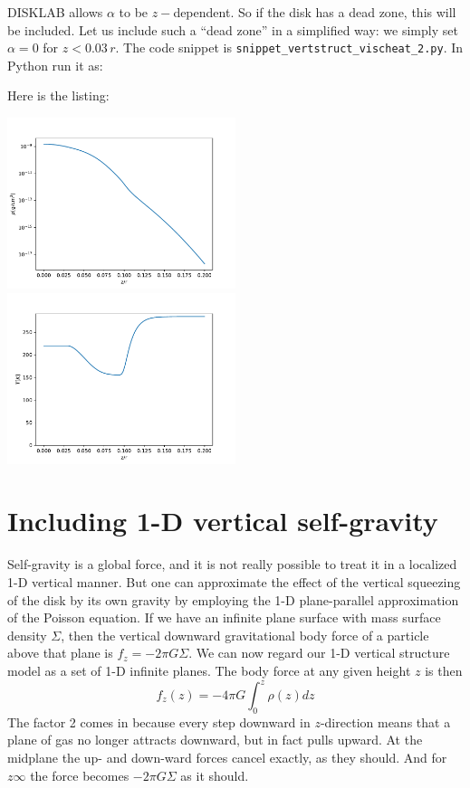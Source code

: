 \documentclass{book}
\newcommand{\code}[1]{{\small\tt #1}}
\begin{document}
{\sf DISKLAB} allows $\alpha$ to be $z-$dependent. So if the disk has a dead
zone, this will be included. Let us include such a ``dead zone'' in a simplified way:
we simply set $\alpha=0$ for $z<0.03\,r$. The code snippet is
\code{snippet\_vertstruct\_vischeat\_2.py}. In Python run it as:
\begin{codebox}
\end{codebox}
Here is the listing:

\centerline{\includegraphics[width=0.5\textwidth]{../snippets/fig_snippet_vertstruct_vischeat_2_1.pdf}
  \includegraphics[width=0.5\textwidth]{../snippets/fig_snippet_vertstruct_vischeat_2_2.pdf}}

\section{Including 1-D vertical self-gravity}
\label{sec-selfgrav1d-vertical}
Self-gravity is a global force, and it is not really possible to treat it in a
localized 1-D vertical manner. But one can approximate the effect of the
vertical squeezing of the disk by its own gravity by employing the 1-D
plane-parallel approximation of the Poisson equation. If we have an infinite
plane surface with mass surface density $\Sigma$, then the vertical downward
gravitational body force of a particle above that plane is $f_z=-2\pi G\Sigma$.
We can now regard our 1-D vertical structure model as a set of 1-D infinite
planes. The body force at any given height $z$ is then
\begin{equation}
f_z(z) = - 4\pi G \int_0^z \rho(z)dz
\end{equation}
The factor 2 comes in because every step downward in $z$-direction means that a
plane of gas no longer attracts downward, but in fact pulls upward. At the midplane
the up- and down-ward forces cancel exactly, as they should. And for $z\infty$ the
force becomes $-2\pi G\Sigma$ as it should. 
\end{document}
